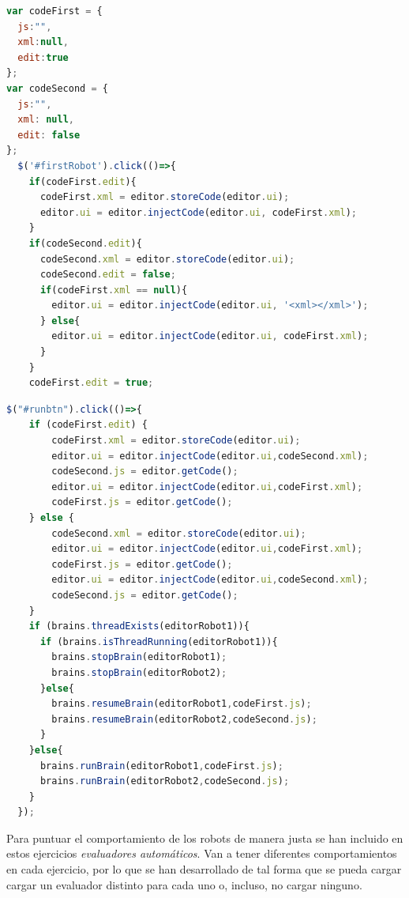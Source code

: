 \begin{lstlisting}[language=javascript,label=lst:savecode, caption=código \textit{JavaScript} para guardar código de un robot]
var codeFirst = {
  js:"",
  xml:null,
  edit:true
};
var codeSecond = {
  js:"",
  xml: null,
  edit: false
};
  $('#firstRobot').click(()=>{
    if(codeFirst.edit){
      codeFirst.xml = editor.storeCode(editor.ui);
      editor.ui = editor.injectCode(editor.ui, codeFirst.xml);
    }
    if(codeSecond.edit){
      codeSecond.xml = editor.storeCode(editor.ui);
      codeSecond.edit = false;
      if(codeFirst.xml == null){
        editor.ui = editor.injectCode(editor.ui, '<xml></xml>');
      } else{
        editor.ui = editor.injectCode(editor.ui, codeFirst.xml);
      }
    }
    codeFirst.edit = true;
\end{lstlisting}

\begin{lstlisting}[language=javascript,caption=código \textit{JavaScript} para ejecutar código de los robots y guardar el que se está editando]
$("#runbtn").click(()=>{
    if (codeFirst.edit) {
        codeFirst.xml = editor.storeCode(editor.ui);
        editor.ui = editor.injectCode(editor.ui,codeSecond.xml);
        codeSecond.js = editor.getCode();
        editor.ui = editor.injectCode(editor.ui,codeFirst.xml);
        codeFirst.js = editor.getCode();
    } else {
        codeSecond.xml = editor.storeCode(editor.ui);
        editor.ui = editor.injectCode(editor.ui,codeFirst.xml);
        codeFirst.js = editor.getCode();
        editor.ui = editor.injectCode(editor.ui,codeSecond.xml);
        codeSecond.js = editor.getCode();
    }
    if (brains.threadExists(editorRobot1)){
      if (brains.isThreadRunning(editorRobot1)){
        brains.stopBrain(editorRobot1);
        brains.stopBrain(editorRobot2);
      }else{
        brains.resumeBrain(editorRobot1,codeFirst.js);
        brains.resumeBrain(editorRobot2,codeSecond.js);
      }
    }else{
      brains.runBrain(editorRobot1,codeFirst.js);
      brains.runBrain(editorRobot2,codeSecond.js);
    }
  });
\end{lstlisting}

Para puntuar el comportamiento de los robots de manera justa se han incluido en estos ejercicios \textit{evaluadores automáticos}. Van a tener diferentes comportamientos en cada ejercicio, por lo que se han desarrollado de tal forma que se pueda cargar cargar un evaluador distinto para cada uno o, incluso, no cargar ninguno. \newline

